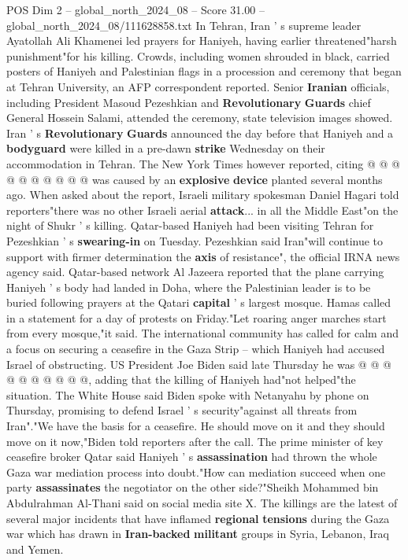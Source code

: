 \begin{textsample}{POS Dim 2 – global\_north\_2024\_08 – Score 31.00 – global\_north\_2024\_08/111628858.txt}
In Tehran, Iran ' s supreme leader Ayatollah Ali Khamenei led prayers for Haniyeh, having earlier threatened"harsh punishment"for his killing.
Crowds, including women shrouded in black, carried posters of Haniyeh and Palestinian flags in a procession and ceremony that began at Tehran University, an AFP correspondent reported.
Senior \textbf{Iranian} officials, including President Masoud Pezeshkian and \textbf{Revolutionary} \textbf{Guards} chief General Hossein Salami, attended the ceremony, state television images showed.
Iran ' s \textbf{Revolutionary} \textbf{Guards} announced the day before that Haniyeh and a \textbf{bodyguard} were killed in a pre-dawn \textbf{strike} Wednesday on their accommodation in Tehran.
The New York Times however reported, citing @ @ @ @ @ @ @ @ @ @ was caused by an \textbf{explosive} \textbf{device} planted several months ago.
When asked about the report, Israeli military spokesman Daniel Hagari told reporters"there was no other Israeli aerial \textbf{attack}... in all the Middle East"on the night of Shukr ' s killing.
Qatar-based Haniyeh had been visiting Tehran for Pezeshkian ' s \textbf{swearing-in} on Tuesday.
Pezeshkian said Iran"will continue to support with firmer determination the \textbf{axis} of resistance", the official IRNA news agency said.
Qatar-based network Al Jazeera reported that the plane carrying Haniyeh ' s body had landed in Doha, where the Palestinian leader is to be buried following prayers at the Qatari \textbf{capital} ' s largest mosque.
Hamas called in a statement for a day of protests on Friday."Let roaring anger marches start from every mosque,"it said.
The international community has called for calm and a focus on securing a ceasefire in the Gaza Strip -- which Haniyeh had accused Israel of obstructing.
US President Joe Biden said late Thursday he was @ @ @ @ @ @ @ @ @ @, adding that the killing of Haniyeh had"not helped"the situation.
The White House said Biden spoke with Netanyahu by phone on Thursday, promising to defend Israel ' s security"against all threats from Iran"."We have the basis for a ceasefire.
He should move on it and they should move on it now,"Biden told reporters after the call.
The prime minister of key ceasefire broker Qatar said Haniyeh ' s \textbf{assassination} had thrown the whole Gaza war mediation process into doubt."How can mediation succeed when one party \textbf{assassinates} the negotiator on the other side?"Sheikh Mohammed bin Abdulrahman Al-Thani said on social media site X.
The killings are the latest of several major incidents that have inflamed \textbf{regional} \textbf{tensions} during the Gaza war which has drawn in \textbf{Iran-backed} \textbf{militant} groups in Syria, Lebanon, Iraq and Yemen.

\end{textsample}
